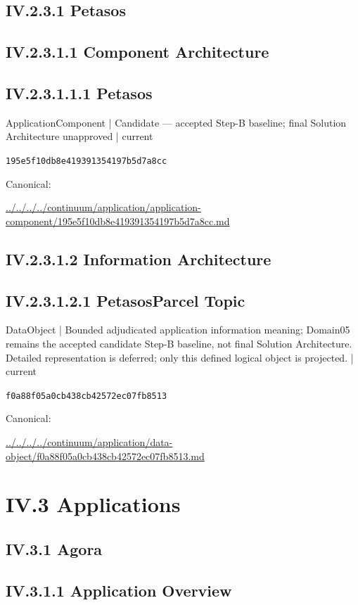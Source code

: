 \documentclass[10pt,a4paper]{article}
\begin{document}
\subsection*{IV.2.3.1 Petasos}
\subsection*{IV.2.3.1.1 Component Architecture}
\subsection*{IV.2.3.1.1.1 Petasos}
\label{element-195e5f10db8e419391354197b5d7a8cc}
{\small ApplicationComponent | Candidate — accepted Step-B baseline; final Solution Architecture unapproved | current}\par
\texttt{195e5f10db8e419391354197b5d7a8cc}\par
Canonical: \par
{\footnotesize\url{../../../../continuum/application/application-component/195e5f10db8e419391354197b5d7a8cc.md}}\par
\subsection*{IV.2.3.1.2 Information Architecture}
\subsection*{IV.2.3.1.2.1 PetasosParcel Topic}
\label{element-f0a88f05a0cb438cb42572ec07fb8513}
{\small DataObject | Bounded adjudicated application information meaning; Domain05 remains the accepted candidate Step-B baseline, not final Solution Architecture. Detailed representation is deferred; only this defined logical object is projected. | current}\par
\texttt{f0a88f05a0cb438cb42572ec07fb8513}\par
Canonical: \par
{\footnotesize\url{../../../../continuum/application/data-object/f0a88f05a0cb438cb42572ec07fb8513.md}}\par
\section*{IV.3 Applications}
\subsection*{IV.3.1 Agora}
\subsection*{IV.3.1.1 Application Overview}
\end{document}

